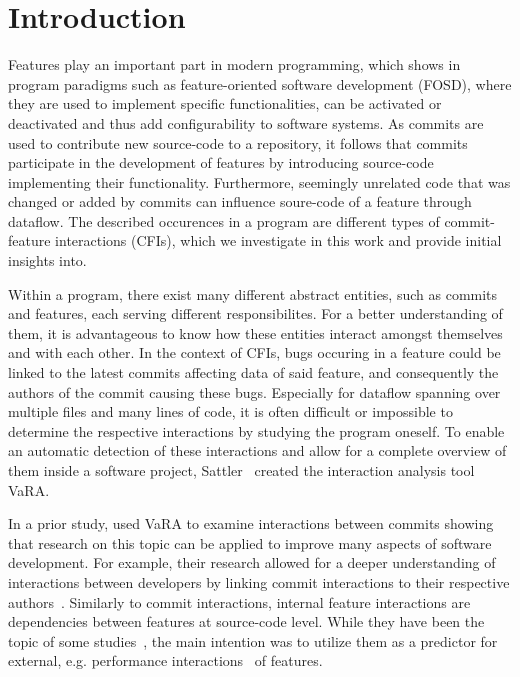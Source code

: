 \chapter{Introduction}\label{ch:introduction}

Features play an important part in modern programming, which shows in program paradigms such as feature-oriented software development (FOSD), where they are used to implement specific functionalities, can be activated or deactivated and thus add configurability to software systems.
As commits are used to contribute new source-code to a repository, it follows that commits participate in the development of features by introducing source-code implementing their functionality. 
Furthermore, seemingly unrelated code that was changed or added by commits can influence soure-code of a feature through dataflow.
The described occurences in a program are different types of commit-feature interactions (CFIs), which we investigate in this work and provide initial insights into. 

Within a program, there exist many different abstract entities, such as commits and features, each serving different responsibilites.
For a better understanding of them, it is advantageous to know how these entities interact amongst themselves and with each other.
In the context of CFIs, bugs occuring in a feature could be linked to the latest commits affecting data of said feature, and consequently the authors of the commit causing these bugs.
Especially for dataflow spanning over multiple files and many lines of code, it is often difficult or impossible to determine the respective interactions by studying the program oneself.
To enable an automatic detection of these interactions and allow for a complete overview of them inside a software project, Sattler~\cite{VaRA2023} created the interaction analysis tool VaRA.

In a prior study, \citet{sattler2023seal} used VaRA to examine interactions between commits showing that research on this topic can be applied to improve many aspects of software development.
For example, their research allowed for a deeper understanding of interactions between developers by linking commit interactions to their respective authors~\cite{sattler2023seal}. 
Similarly to commit interactions, internal feature interactions are dependencies between features at source-code level. 
While they have been the topic of some studies~\cite{kolesnikov2017relation}, the main intention was to utilize them as a predictor for external, e.g. performance interactions~\cite{siegmund2012predicting} of features.

